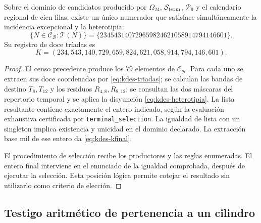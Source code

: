 \begin{theorem}
Sobre el dominio de candidatos producido por
$\Omega_{24}$, $\mathcal S_{\rm term}$, $\mathcal P_9$ y el calendario
regional de cien filas, existe un único numerador que satisface
simultáneamente la incidencia excepcional y la heterotipia:
\[
 \{N\in\mathcal C_{\mathcal B}:\mathcal T(N)\}
 =\{234543140729659824621058914794146601\}.
\]
Su registro de doce tríadas es
\begin{equation}
 K=(234,543,140,729,659,824,621,058,914,794,146,601).
 \label{eq:kdes-kfinal}
\end{equation}
\end{theorem}
\begin{proof}
El censo precedente produce los $79$ elementos de
$\mathcal C_{\mathcal B}$. Para cada uno se extraen sus doce
coordenadas por \eqref{eq:kdes-triadas}; se calculan las bandas de
destino $T_8,T_{12}$ y los residuos $R_{4,8},R_{8,12}$; se consultan
las dos máscaras del repertorio temporal y se aplica la disyunción
\eqref{eq:kdes-heterotipia}. La lista resultante contiene exactamente
el entero indicado, según la evaluación exhaustiva certificada por
\texttt{terminal\_selection}. La igualdad de lista con un singleton
implica existencia y unicidad en el dominio declarado. La extracción
base mil de ese entero da \eqref{eq:kdes-kfinal}.

El procedimiento de selección recibe los productores y las reglas
enumeradas. El entero final interviene en el enunciado de la igualdad
comprobada, después de ejecutar la selección. Esta posición lógica
permite cotejar el resultado sin utilizarlo como criterio de elección.
\end{proof}

\subsection{Testigo aritmético de pertenencia a un cilindro}

